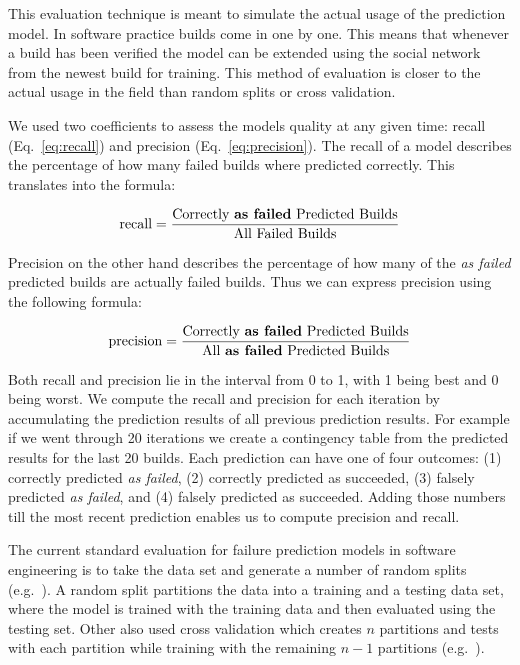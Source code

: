 This evaluation technique is meant to simulate the actual usage of the prediction model.
In software practice builds come in one by one.
This means that whenever a build has been verified the model can be extended using the social network from the newest build for training. 
This method of evaluation is closer to the actual usage in the field than
random splits or cross validation.

We used two coefficients to assess the models quality at any given time: recall (Eq.~\ref{eq:recall}) and precision (Eq.~\ref{eq:precision}).
The recall of a model describes the percentage of how many failed builds where predicted correctly.
This translates into the formula:

\begin{equation}
\label{eq:recall}
\text{recall}=\frac{\text{Correctly \emph{as failed} Predicted Builds}}{\text{All Failed Builds}}
\end{equation}

Precision on the other hand describes the percentage of how many of the \emph{as failed} predicted builds are actually failed builds. Thus we can express precision using the following formula:

\begin{equation}
\label{eq:precision}
\text{precision}=\frac{\text{Correctly \emph{as failed} Predicted Builds}}{\text{All \emph{as failed} Predicted Builds}}
\end{equation}

Both recall and precision lie in the interval from 0 to 1, with 1 being best and 0 being worst.
We compute the recall and precision for each iteration by accumulating the prediction results of all previous prediction results.
For example if we went through 20 iterations we create a contingency table from the predicted results for the last 20 builds.
Each prediction can have one of four outcomes: (1) correctly predicted \emph{as failed}, (2) correctly predicted as succeeded, (3) falsely predicted \emph{as failed}, and (4) falsely predicted as succeeded.
Adding those numbers till the most recent prediction enables us to compute precision and recall.


The current standard evaluation for failure prediction models in software engineering is to take the data set and generate a number of random splits (e.g.~\cite{zimmermann:icse:2008,schroeter:isese:2006,nagappan:icse:2008}).
A random split partitions the data into a training and a testing data set, where the model is trained with the training data and then evaluated using the testing set.
Other also used cross validation which creates $n$ partitions and tests with each partition while training with the remaining $n-1$ partitions (e.g.~\cite{wolf:icse:2009}).

